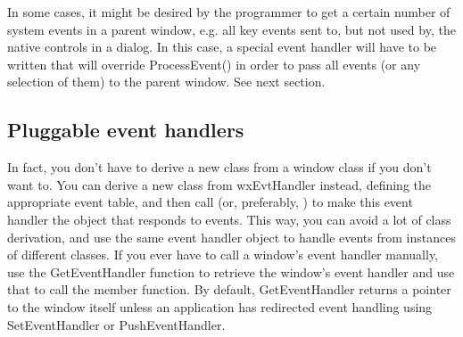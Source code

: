 \begin{twocollist}\itemsep=0pt
\end{twocollist}

In some cases, it might be desired by the programmer to get a certain number
of system events in a parent window, e.g. all key events sent to, but not
used by, the native controls in a dialog. In this case, a special event handler
will have to be written that will override ProcessEvent() in order to pass
all events (or any selection of them) to the parent window. See next section.

\subsection{Pluggable event handlers}

In fact, you don't have to derive a new class from a window class
if you don't want to. You can derive a new class from wxEvtHandler instead,
defining the appropriate event table, and then call
\rtfsp{} (or, preferably,
\rtfsp{}) to make this
event handler the object that responds to events. This way, you can avoid
a lot of class derivation, and use the same event handler object to
handle events from instances of different classes. If you ever have to call a window's event handler
manually, use the GetEventHandler function to retrieve the window's event handler and use that
to call the member function. By default, GetEventHandler returns a pointer to the window itself
unless an application has redirected event handling using SetEventHandler or PushEventHandler.

